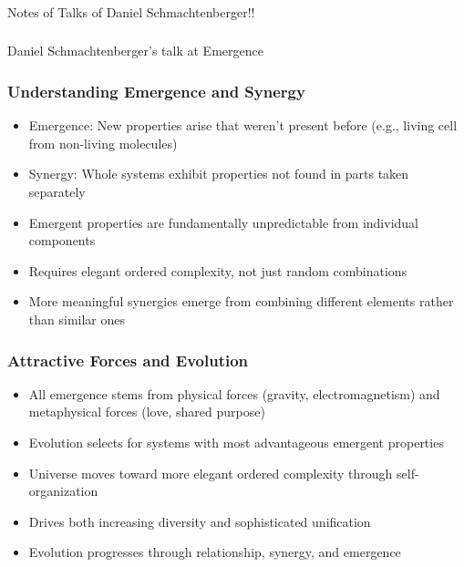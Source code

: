 \begin{frame}[fragile]\frametitle{}
\begin{center}
{\Large Notes of Talks of Daniel Schmachtenberger!!}

\end{center}
\end{frame}

\begin{frame}[fragile]\frametitle{}
\begin{center}
{\Large Daniel Schmachtenberger's talk at Emergence}

\end{center}
\end{frame}

\begin{frame}[fragile]\frametitle{Understanding Emergence and Synergy}
	\begin{itemize}
	\item Emergence: New properties arise that weren't present before (e.g., living cell from non-living molecules)
	\item Synergy: Whole systems exhibit properties not found in parts taken separately
	\item Emergent properties are fundamentally unpredictable from individual components
	\item Requires elegant ordered complexity, not just random combinations
	\item More meaningful synergies emerge from combining different elements rather than similar ones
	\end{itemize}
\end{frame}

\begin{frame}[fragile]\frametitle{Attractive Forces and Evolution}
	\begin{itemize}
	\item All emergence stems from physical forces (gravity, electromagnetism) and metaphysical forces (love, shared purpose)
	\item Evolution selects for systems with most advantageous emergent properties
	\item Universe moves toward more elegant ordered complexity through self-organization
	\item Drives both increasing diversity and sophisticated unification
	\item Evolution progresses through relationship, synergy, and emergence
	\end{itemize}
\end{frame}

